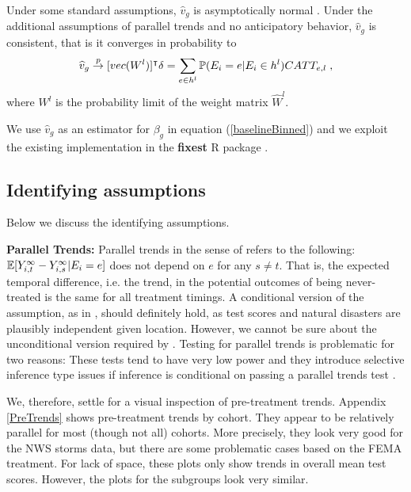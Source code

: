 Under some standard assumptions, $\widehat{v}_g$ is asymptotically normal \citep[for a proof and a detailed description of said assumptions see][Appendix C]{Sun_2021}. Under the additional assumptions of parallel trends and no anticipatory behavior, $\widehat{v}_g$ is consistent, that is it converges in probability to
\begin{align*}
	\widehat{v}_g \overset{p}{\to} [vec(W^{l})]^\intercal \delta = \sum_{e \in h^{l}} \mathbb{P}(E_i = e | E_i \in h^{l}) CATT_{e, l} \; ,
\end{align*}
where $W^{l}$ is the probability limit of the weight matrix $\widehat{W}^l$.

We use $\widehat{v}_g$ as an estimator for $\beta_{g}$ in equation (\ref{baselineBinned}) and we exploit the existing implementation in the \textbf{fixest} R package \citep{Berge_2018}.

\subsection{Identifying assumptions}

Below we discuss the identifying assumptions.

\textbf{Parallel Trends:} Parallel trends in the sense of \cite{Sun_2021} refers to the following: $\mathbb{E}[Y_{i, t}^{\infty} - Y_{i, s}^{\infty} | E_i = e]$ does not depend on $e$ for any $s \neq t$. That is, the expected temporal difference, i.e. the trend, in the potential outcomes of being never-treated is the same for all treatment timings. A conditional version of the assumption, as in \cite{Callaway_2021}, should definitely hold, as test scores and natural disasters are plausibly independent given location. However, we cannot be sure about the unconditional version required by \cite{Sun_2021}. Testing for parallel trends is problematic for two reasons: These tests tend to have very low power and they introduce selective inference type issues if inference is conditional on passing a parallel trends test \citep{Rambachan_2019}.

We, therefore, settle for a visual inspection of pre-treatment trends. Appendix \ref{PreTrends} shows pre-treatment trends by cohort. They appear to be relatively parallel for most (though not all) cohorts. More precisely, they look very good for the NWS storms data, but there are some problematic cases based on the FEMA treatment. For lack of space, these plots only show trends in overall mean test scores. However, the plots for the subgroups look very similar.

